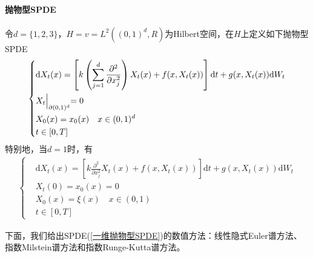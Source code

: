             \paragraph{抛物型SPDE}
            令$d = \{1,2,3\}$，$H = v = L^2((0,1)^d,R)$为Hilbert空间，在$H$上定义如下抛物型SPDE
            \begin{align*}
                \left\{
                    \begin{aligned}
                    &\mathrm{d}X_t(x) = \left[ k \left( \sum_{j = 1}^d \frac{\partial^2}{\partial x_j^2} \right)X_t(x)+ f(x,X_t(x))   \right]\mathrm{d}t + g(x,X_t(x))\mathrm{d}W_t\\
                    &X_t\Bigl|_{\partial (0,1)^d} = 0\\
                    &X_0(x) = x_0(x)\quad x\in (0,1)^d\\
                    &t\in [0,T]
                    \end{aligned}
                \right.
            \end{align*}
            特别地，当$d=1$时，有
            \begin{align}
                \label{一维抛物型SPDE}
                \left\{
                    \begin{aligned}
                    &\mathrm{d}X_t(x) = \left[ k  \frac{\partial^2}{\partial x_j^2} X_t(x)+ f(x,X_t(x))   \right]\mathrm{d}t + g(x,X_t(x))\mathrm{d}W_t\\
                    &X_t(0) = x_0(x) = 0\\
                    &X_0(x) = \xi(x)\quad x\in (0,1)\\
                    &t\in [0,T]
                    \end{aligned}
                \right.
            \end{align}
            \par
            下面，我们给出SPDE(\ref{一维抛物型SPDE})的数值方法：线性隐式Euler谱方法、指数Milstein谱方法和指数Runge-Kutta谱方法。

